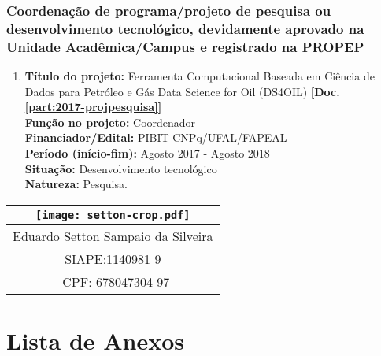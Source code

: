 \documentclass[a4paper,oneside,10pt]{article}
\begin{document}

\subsubsection{Coordenação de programa/projeto de pesquisa ou desenvolvimento tecnológico, devidamente aprovado na Unidade Acadêmica/Campus e registrado na PROPEP}
\vspace{0.3cm}

\begin{enumerate}
\renewcommand{\labelenumi}{{\large\bfseries\arabic{enumi}.}}

\item \textbf{Título do projeto:} Ferramenta Computacional Baseada em Ciência de Dados para Petróleo e Gás Data Science for Oil (DS4OIL) \textbf{[Doc. \ref{part:2017-projpesquisa}]}\\
      \textbf{Função no projeto:} Coordenador\\
      \textbf{Financiador/Edital:} PIBIT-CNPq/UFAL/FAPEAL\\
      \textbf{Período (início-fim):} Agosto 2017 - Agosto 2018\\
      \textbf{Situação:} Desenvolvimento tecnológico\\
      \textbf{Natureza:} Pesquisa.
\end{enumerate}

\vspace{5cm}
\begin{center}
\begin{tabular}{c}    
    \texttt{[image: setton-crop.pdf]} \\
    \hline
    Eduardo Setton Sampaio da Silveira\\
    SIAPE:1140981-9\\\
    CPF: 678047304-97\\
\end{tabular}
\end{center}
\vfill



\newpage
\section{Lista de Anexos}
\end{document}
